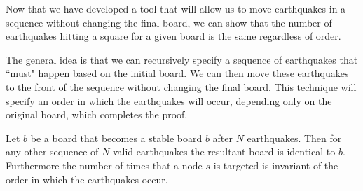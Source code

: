 \documentclass[runningheads,a4paper]{llncs}
\begin{document}
Now that we have developed a tool that will allow us to move earthquakes in a sequence without changing the final board, we can show that the number of earthquakes hitting a square for a given board is the same regardless of order. 

The general idea is that we can recursively specify a sequence of earthquakes that ``must" happen based on the initial board. We can then move these earthquakes to the front of the sequence without changing the final board. This technique will specify an order in which the earthquakes will occur, depending only on the original board, which completes the proof.

\begin{theorem}
\label{thm:order}
Let $b$ be a board that becomes a stable board $b$ after $N$ earthquakes. Then for any other sequence of $N$ valid earthquakes the resultant board is identical to $b$. Furthermore the number of times that a node $s$ is targeted is invariant of the order in which the earthquakes occur. 
\end{theorem}
\end{document}
